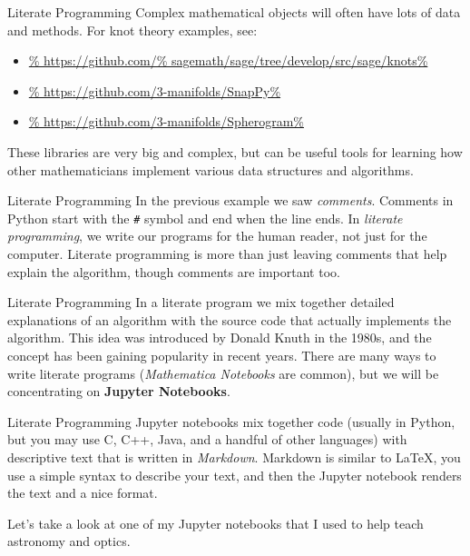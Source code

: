 \documentclass{beamer}
\begin{document}
    \begin{frame}[fragile]{Literate Programming}
        Complex mathematical objects will often have lots of data and methods.
        For knot theory examples, see:
        \begin{itemize}
            \item
                \footnotesize\url{%
                    https://github.com/%
                        sagemath/sage/tree/develop/src/sage/knots%
                }
            \item
                \footnotesize\url{%
                    https://github.com/3-manifolds/SnapPy%
                }
            \item
                \footnotesize\url{%
                    https://github.com/3-manifolds/Spherogram%
                }
        \end{itemize}
        These libraries are very big and complex, but can be useful tools
        for learning how other mathematicians implement various data
        structures and algorithms.
    \end{frame}
    \begin{frame}[fragile]{Literate Programming}
        In the previous example we saw \textit{comments}. Comments in Python
        start with the \texttt{\#} symbol and end when the line ends.
        In \textit{literate programming}, we write our programs for the human
        reader, not just for the computer. Literate programming is more than
        just leaving comments that help explain the algorithm, though comments
        are important too.
    \end{frame}
    \begin{frame}[fragile]{Literate Programming}
        In a literate program we mix together detailed explanations of an
        algorithm with the source code that actually implements the algorithm.
        This idea was introduced by Donald Knuth in the 1980s, and the concept
        has been gaining popularity in recent years. There are many ways to
        write literate programs (\textit{Mathematica Notebooks} are common),
        but we will be concentrating on \textbf{Jupyter Notebooks}.
    \end{frame}
    \begin{frame}[fragile]{Literate Programming}
        Jupyter notebooks mix together code (usually in Python, but you may
        use C, C++, Java, and a handful of other languages) with
        descriptive text that is written in \textit{Markdown}. Markdown is
        similar to \LaTeX, you use a simple syntax to describe your text, and
        then the Jupyter notebook renders the text and a nice format.
        \par\hfill\par
        Let's take a look at one of my Jupyter notebooks that I used to help
        teach astronomy and optics.
    \end{frame}
\end{document}
